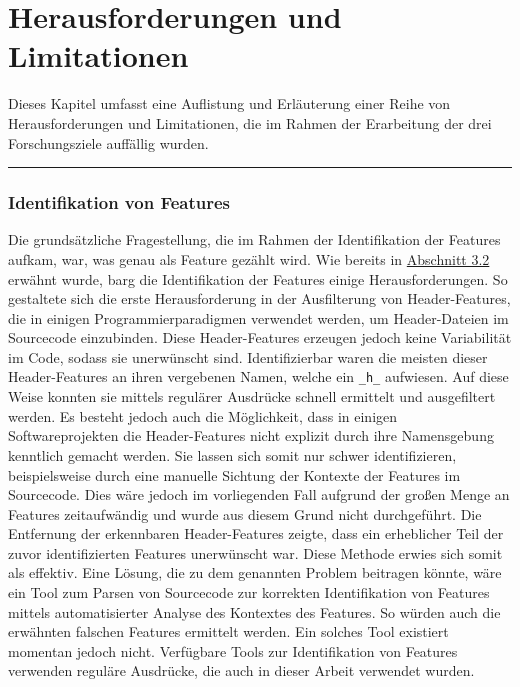 
\chapter{Herausforderungen und Limitationen}
\label{challenges-list}

Dieses Kapitel umfasst eine Auflistung und Erläuterung einer Reihe von Herausforderungen und Limitationen, die im Rahmen der Erarbeitung der drei Forschungsziele auffällig wurden.
\\
\hrule

\subsection*{Identifikation von Features}

Die grundsätzliche Fragestellung, die im Rahmen der Identifikation der Features aufkam, war, was genau als Feature gezählt wird. Wie bereits in \hyperref[construction]{Abschnitt 3.2} erwähnt wurde, barg die Identifikation der Features einige Herausforderungen. So gestaltete sich die erste Herausforderung in der Ausfilterung von \glqq Header-Features\grqq{}, die in einigen Programmierparadigmen verwendet werden, um Header-Dateien im Sourcecode einzubinden. Diese Header-Features erzeugen jedoch keine Variabilität im Code, sodass sie unerwünscht sind. Identifizierbar waren die meisten dieser Header-Features an ihren vergebenen Namen, welche ein \texttt{\_h\_} aufwiesen. Auf diese Weise konnten sie mittels regulärer Ausdrücke schnell ermittelt und ausgefiltert werden. Es besteht jedoch auch die Möglichkeit, dass in einigen Softwareprojekten die Header-Features nicht explizit durch ihre Namensgebung kenntlich gemacht werden. Sie lassen sich somit nur schwer identifizieren, beispielsweise durch eine manuelle Sichtung der Kontexte der Features im Sourcecode. Dies wäre jedoch im vorliegenden Fall aufgrund der großen Menge an Features zeitaufwändig und wurde aus diesem Grund nicht durchgeführt. Die Entfernung der erkennbaren Header-Features zeigte, dass ein erheblicher Teil der zuvor identifizierten Features unerwünscht war. Diese Methode erwies sich somit als effektiv.
Eine Lösung, die zu dem genannten Problem beitragen könnte, wäre ein Tool zum Parsen von Sourcecode zur korrekten Identifikation von Features mittels automatisierter Analyse des Kontextes des Features. So würden auch die erwähnten \glqq falschen\grqq{} Features ermittelt werden. Ein solches Tool existiert momentan jedoch nicht. Verfügbare Tools zur Identifikation von Features verwenden reguläre Ausdrücke, die auch in dieser Arbeit verwendet wurden.

